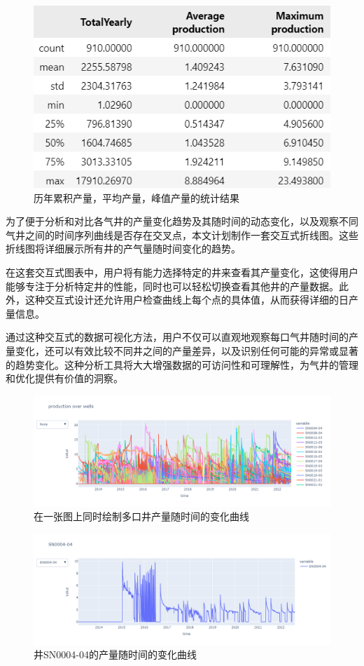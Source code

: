 \begin{figure}[H]
    \centering
    \includegraphics{figure/gasproduction.png}
    \caption{历年累积产量，平均产量，峰值产量的统计结果}
\end{figure}

为了便于分析和对比各气井的产量变化趋势及其随时间的动态变化，以及观察不同气井之间的时间序列曲线是否存在交叉点，本文计划制作一套交互式折线图。这些折线图将详细展示所有井的产气量随时间变化的趋势。

在这套交互式图表中，用户将有能力选择特定的井来查看其产量变化，这使得用户能够专注于分析特定井的性能，同时也可以轻松切换查看其他井的产量数据。此外，这种交互式设计还允许用户检查曲线上每个点的具体值，从而获得详细的日产量信息。

通过这种交互式的数据可视化方法，用户不仅可以直观地观察每口气井随时间的产量变化，还可以有效比较不同井之间的产量差异，以及识别任何可能的异常或显著的趋势变化。这种分析工具将大大增强数据的可访问性和可理解性，为气井的管理和优化提供有价值的洞察。
\begin{figure}[H]
    \centering
    \includegraphics[scale=0.3,angle=0]{figure/productiongraph.png}
    \caption{在一张图上同时绘制多口井产量随时间的变化曲线}
    \label{fig:productionchange}
\end{figure}
\begin{figure}[H]
    \centering
    \includegraphics[scale=0.3,angle=0]{figure/awellgraph.png}
    \caption{井SN0004-04的产量随时间的变化曲线}
\end{figure}
